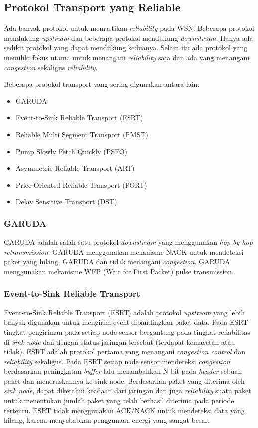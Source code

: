\subsection{Protokol Transport yang Reliable}
Ada banyak protokol untuk memastikan \textit{reliability} pada WSN. Beberapa protokol mendukung \textit{upstream} dan beberapa protokol mendukung \textit{downstream}. Hanya ada sedikit protokol yang dapat mendukung keduanya. Selain itu ada protokol yang memiliki fokus utama untuk menangani \textit{reliability} saja dan ada yang menangani \textit{congestion} sekaligus \textit{reliability}. 

Beberapa protokol transport yang sering digunakan antara lain:
\begin{itemize}
	\item GARUDA
	\item Event-to-Sink Reliable Transport (ESRT)
	\item Reliable Multi Segment Transport (RMST)
	\item Pump Slowly Fetch Quickly (PSFQ)
	\item Asymmetric Reliable Transport (ART)
	\item Price Oriented Reliable Transport (PORT)
	\item Delay Sensitive Transport (DST)
\end{itemize}

\subsubsection{GARUDA}
GARUDA adalah salah satu protokol \textit{downstream} yang menggunakan \textit{hop-by-hop retransmission}. GARUDA menggunakan mekanisme NACK untuk mendeteksi paket yang hilang. GARUDA dan tidak menangani \textit{congestion}. GARUDA menggunakan mekanisme WFP (Wait for First Packet) pulse transmission.

\subsubsection{Event-to-Sink Reliable Transport}
Event-to-Sink Reliable Transport (ESRT) adalah protokol \textit{upstream} yang lebih banyak digunakan untuk mengirim event dibandingkan paket data. Pada ESRT tingkat pengiriman pada setiap node sensor bergantung pada tingkat reliabilitas di \textit{sink node} dan dengan status jaringan tersebut (terdapat kemacetan atau tidak). ESRT adalah protokol pertama yang menangani \textit{congestion control} dan \textit{reliability} sekaligus. Pada ESRT setiap node sensor mendeteksi \textit{congestion} berdasarkan peningkatan \textit{buffer} lalu menambahkan N bit pada \textit{header} sebuah paket dan meneruskannya ke sink node. Berdasarkan paket yang diterima oleh \textit{sink node}, dapat diketahui keadaan dari jaringan dan juga \textit{reliability} suatu paket untuk menentukan jumlah paket yang telah berhasil diterima pada periode tertentu. ESRT tidak menggunakan ACK/NACK untuk mendeteksi data yang hilang, karena menyebabkan penggunaan energi yang sangat besar.

